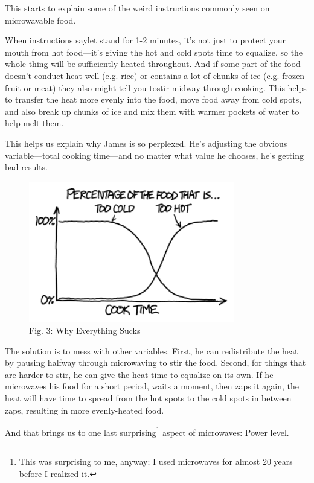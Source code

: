 {{This starts to explain some of the weird instructions commonly seen on microwavable food.}

{When instructions saylet stand for 1-2 minutes, it's not just to protect your mouth from hot food—it's giving the hot and cold spots time to equalize, so the whole thing will be sufficiently heated throughout. And if some part of the food doesn't conduct heat well (e.g. rice) or contains a lot of chunks of ice (e.g. frozen fruit or meat) they also might tell you tostir midway through cooking. This helps to transfer the heat more evenly into the food, move food away from cold spots, and also break up chunks of ice and mix them with warmer pockets of water to help melt them.}

{This helps us explain why James is so perplexed. He's adjusting the obvious variable—total cooking time—and no matter what value he chooses, he's getting bad results.}

\begin{figure}[!htbp]
\centering
\includegraphics[scale=0.5, max width=0.8\textwidth]{imgs/a/131/variables.png}
\caption{Fig. 3: Why Everything Sucks}
\end{figure}

{The solution is to mess with other variables. First, he can redistribute the heat by pausing halfway through microwaving to stir the food. Second, for things that are harder to stir, he can give the heat time to equalize on its own. If he microwaves his food for a short period, waits a moment, then zaps it again, the heat will have time to spread from the hot spots to the cold spots in between zaps, resulting in more evenly-heated food.}

{And that brings us to one last surprising{\footnote{This was surprising to me, anyway; I used microwaves for almost 20 years before I realized it.} } aspect of microwaves: Power level.}

}
